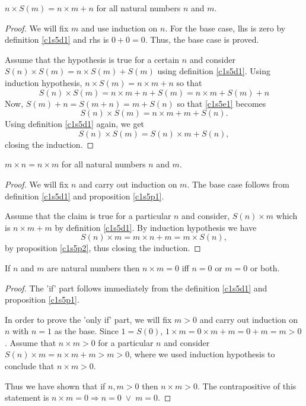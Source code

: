 \begin{prop}\label{c1s5p2}
$n \times S(m) = n \times m + n$ for all natural numbers $n$ and $m$.
\end{prop}
\begin{proof}
We will fix $m$ and use induction on $n$. For the base case, lhs is zero by
definition \ref{c1s5d1} and rhs is $0 + 0 = 0$. Thus, the base case is 
proved.

Assume that the hypothesis is true for a certain $n$ and consider $S(n) 
\times S(m) = n \times S(m) + S(m)$ using definition \ref{c1s5d1}. Using 
induction hypothesis, $n \times S(m) = n \times m + n$ so that
\begin{equation}\label{c1s5e1}
S(n) \times S(m) = n \times m + n + S(m) = n \times m + S(m) + n
\end{equation}
Now, $S(m) + n = S(m + n) = m + S(n)$ so that \eqref{c1s5e1} becomes
\begin{equation}\label{c1s5e2}
S(n) \times S(m) = n \times m + m + S(n).
\end{equation}
Using definition \eqref{c1s5d1} again, we get
\begin{equation}\label{c1s5e3}
S(n) \times S(m) = S(n) \times m + S(n),
\end{equation}
closing the induction.
\end{proof}

\begin{prop}\label{c1s5p3}
$m \times n = n \times m$ for all natural numbers $n$ and $m$.
\end{prop}
\begin{proof}
We will fix $n$ and carry out induction on $m$. The base case follows from 
definition \ref{c1s5d1} and proposition \ref{c1s5p1}.

Assume that the claim is true for a particular $n$ and consider, $S(n) 
\times m$ which is $n \times m + m$ by definition \ref{c1s5d1}. By 
induction hypothesis we have
\begin{equation}\label{c1s5e4}
S(n) \times m = m \times n + m = m \times S(n),
\end{equation}
by proposition \ref{c1s5p2}, thus closing the induction.
\end{proof}

\begin{prop}\label{c1s5p4}
If $n$ and $m$ are natural numbers then $n \times m = 0$ iff $n = 0$ or
$m = 0$ or both.
\end{prop}
\begin{proof}
The 'if' part follows immediately from the definition \ref{c1s5d1} and
proposition \ref{c1s5p1}.

In order to prove the 'only if' part, we will fix $m > 0$ and carry out 
induction on $n$ with $n = 1$ as the base. Since $1 = S(0)$, $1 \times m
= 0 \times m + m = 0 + m = m > 0$. Assume that $n \times m > 0$ for a 
particular $n$ and consider $S(n) \times m = n \times m + m > m > 0$, where
we used induction hypothesis to conclude that $n \times m > 0$. 

Thus we have shown that if $n, m > 0$ then $n \times m > 0$. The 
contrapositive of this statement is $n \times m = 0 \Rightarrow n = 0
\;\lor\; m = 0$.
\end{proof}

